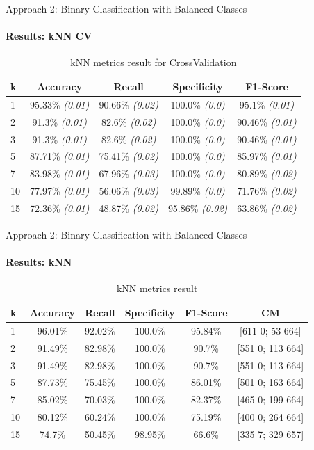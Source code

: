 \documentclass[9pt, pstricks, xcolor=dvipsnames]{beamer}
\begin{document}
\begin{frame}{Approach 2: Binary Classification
		with Balanced Classes}
	\framesubtitle{Results: kNN CV}
	\begin{table}[H]
		\centering
		\begin{tabular}{lcccc}
			\toprule
			k  & Accuracy                & Recall                  & Specificity             & F1-Score                \\
			\midrule
			1  & 95.33\% \textit{(0.01)} & 90.66\% \textit{(0.02)} & 100.0\% \textit{(0.0)}  & 95.1\% \textit{(0.01)}  \\
			2  & 91.3\% \textit{(0.01)}  & 82.6\% \textit{(0.02)}  & 100.0\% \textit{(0.0)}  & 90.46\% \textit{(0.01)} \\
			3  & 91.3\% \textit{(0.01)}  & 82.6\% \textit{(0.02)}  & 100.0\% \textit{(0.0)}  & 90.46\% \textit{(0.01)} \\
			5  & 87.71\% \textit{(0.01)} & 75.41\% \textit{(0.02)} & 100.0\% \textit{(0.0)}  & 85.97\% \textit{(0.01)} \\
			7  & 83.98\% \textit{(0.01)} & 67.96\% \textit{(0.03)} & 100.0\% \textit{(0.0)}  & 80.89\% \textit{(0.02)} \\
			10 & 77.97\% \textit{(0.01)} & 56.06\% \textit{(0.03)} & 99.89\% \textit{(0.0)}  & 71.76\% \textit{(0.02)} \\
			15 & 72.36\% \textit{(0.01)} & 48.87\% \textit{(0.02)} & 95.86\% \textit{(0.02)} & 63.86\% \textit{(0.02)} \\
			\bottomrule
		\end{tabular}
		\caption{kNN metrics result for CrossValidation}
		\label{tab:kNN_CV_approach2}
	\end{table}
\end{frame}
\begin{frame}{Approach 2: Binary Classification
		with Balanced Classes}
	\framesubtitle{Results: kNN}
	\begin{table}[H]
		\centering
		\begin{tabular}{lccccc}
			\toprule
			k  & Accuracy & Recall  & Specificity & F1-Score & CM               \\
			\midrule
			1  & 96.01\%  & 92.02\% & 100.0\%     & 95.84\%  & [611 0; 53 664]  \\
			2  & 91.49\%  & 82.98\% & 100.0\%     & 90.7\%   & [551 0; 113 664] \\
			3  & 91.49\%  & 82.98\% & 100.0\%     & 90.7\%   & [551 0; 113 664] \\
			5  & 87.73\%  & 75.45\% & 100.0\%     & 86.01\%  & [501 0; 163 664] \\
			7  & 85.02\%  & 70.03\% & 100.0\%     & 82.37\%  & [465 0; 199 664] \\
			10 & 80.12\%  & 60.24\% & 100.0\%     & 75.19\%  & [400 0; 264 664] \\
			15 & 74.7\%   & 50.45\% & 98.95\%     & 66.6\%   & [335 7; 329 657] \\
			\bottomrule
		\end{tabular}
		\caption{kNN metrics result}
		\label{tab:kNN_approach2}
	\end{table}
\end{frame}
\end{document}
